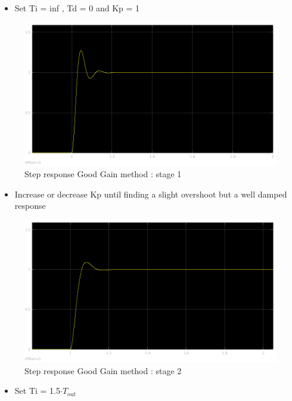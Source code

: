 \begin{itemize}
  \item Set Ti = inf , Td = 0 and Kp = 1
\end{itemize}
  
  \begin{figure}[H]
    \centering
    \includegraphics[scale=0.4]{figures/GoodGain_step1.png}
    \caption[LABEL] {Step response Good Gain method : stage 1} 
  \end{figure}
  

\begin{itemize}
  \item Increase or decrease Kp until finding a slight overshoot but a well damped response
\end{itemize}
  
  \begin{figure}[H]
    \centering
    \includegraphics[scale=0.4]{figures/GoodGain_step2.png}
    \caption[LABEL] {Step response Good Gain method : stage 2} 
  \end{figure}
    
    
\begin{itemize}
  \item Set Ti = 1.5$\cdot T_{out}$
\end{itemize}
  
